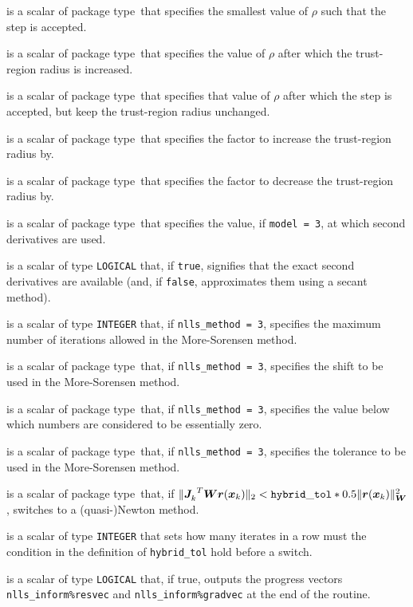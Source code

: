 \documentclass{spec}
\newcommand{\scalarinteger}{is a scalar of type {\tt INTEGER} }
\newcommand{\scalarlogical}{is a scalar of type {\tt LOGICAL} }
\newcommand{\scalarreal}{is a scalar of package type\ }
\begin{document}
\begin{description}
 \scalarreal that specifies the smallest value of $\rho$ such that the step is accepted.

 \scalarreal that specifies the value of $\rho$ after which the trust-region radius is increased.

 \scalarreal that specifies that value of $\rho$ after which the step is accepted,
but keep the trust-region radius unchanged.

 \scalarreal that specifies the factor to increase the trust-region radius by.

 \scalarreal that specifies the factor to decrease the trust-region radius by.

 \scalarreal that specifies the value, if {\tt model = 3},
at which second derivatives are used.

 \scalarlogical that, if {\tt true}, signifies that the
exact second derivatives are available (and, if {\tt false}, approximates them using a secant method).

 \scalarinteger that, if {\tt nlls\_method = 3}, specifies the maximum number of iterations allowed in the More-Sorensen method.

 \scalarreal that, if {\tt nlls\_method = 3}, specifies the shift to be used in the More-Sorensen method.

 \scalarreal that, if {\tt nlls\_method = 3}, specifies the value
below which numbers are considered to be essentially zero.

 \scalarreal that, if {\tt nlls\_method = 3}, specifies the tolerance
to be used in the More-Sorensen method.

 \scalarreal that, if \(\|{{\bm J}_{k}^{}}^T {\bm W} {\bm r}({\bm x}_k) \|_2 < \mathtt{hybrid\_tol} * 0.5 \|{\bm r}({\bm x}_k)\|_{\bm W}^2\), switches to a \newline(quasi-)Newton method.

 \scalarinteger that sets how many iterates in a row must
the condition in the definition of {\tt hybrid\_tol} hold before a switch.

 \scalarlogical that, if true, outputs the progress vectors {\tt nlls\_inform\%resvec} and {\tt nlls\_inform\%gradvec} at the end of the routine.

\end{description}
\end{document}
